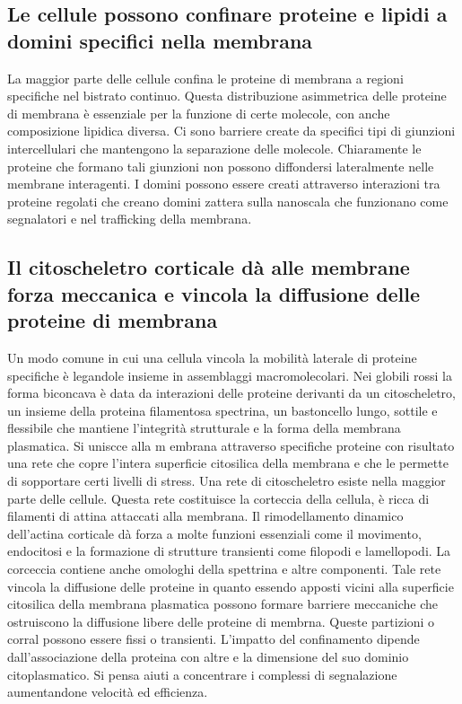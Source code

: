\subsection{Le cellule possono confinare proteine e lipidi a domini specifici nella membrana}
La maggior parte delle cellule confina le proteine di membrana a regioni specifiche nel bistrato continuo. Questa distribuzione asimmetrica delle proteine di membrana \`e essenziale per
la funzione di certe molecole, con anche composizione lipidica diversa. Ci sono barriere create da specifici tipi di giunzioni intercellulari che mantengono la separazione delle 
molecole. Chiaramente le proteine che formano tali giunzioni non possono diffondersi lateralmente nelle membrane interagenti. I domini possono essere creati attraverso interazioni tra
proteine regolati che creano domini zattera sulla nanoscala che funzionano come segnalatori e nel trafficking della membrana. 	
\subsection{Il citoscheletro corticale d\`a alle membrane forza meccanica e vincola la diffusione delle proteine di membrana}
Un modo comune in cui una cellula vincola la mobilit\`a laterale di proteine specifiche \`e legandole insieme in assemblaggi macromolecolari. Nei globili rossi la forma biconcava \`e 
data da interazioni delle proteine derivanti da un citoscheletro, un insieme della proteina filamentosa spectrina, un bastoncello lungo, sottile e flessibile che mantiene l'integrit\`a
strutturale e la forma della membrana plasmatica. Si uniscce alla m embrana attraverso specifiche proteine con risultato una rete che copre l'intera superficie citosilica della 
membrana e che le permette di sopportare certi livelli di stress. Una rete di citoscheletro esiste nella maggior parte delle cellule. Questa rete costituisce la corteccia della cellula,
\`e ricca di filamenti di attina attaccati alla membrana. Il rimodellamento dinamico dell'actina corticale d\`a forza a molte funzioni essenziali come il movimento, endocitosi e la
formazione di strutture transienti come filopodi e lamellopodi. La corceccia contiene anche omologhi della spettrina e altre componenti. Tale rete vincola la diffusione delle proteine
in quanto essendo apposti vicini alla superficie citosilica della membrana plasmatica possono formare barriere meccaniche che ostruiscono la diffusione libere delle proteine di membrna.
Queste partizioni o corral possono essere fissi o transienti. L'impatto del confinamento dipende dall'associazione della proteina con altre e la dimensione del suo dominio 
citoplasmatico. Si pensa aiuti a concentrare i complessi di segnalazione aumentandone velocit\`a ed efficienza.
